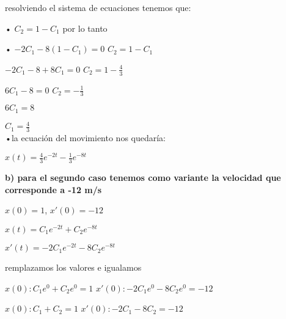 \documentclass[12pt,a4paper]{article}
\begin{document}
\vspace{0.6cm}

resolviendo el sistema de ecuaciones tenemos que:

\vspace{0.3cm}

• $C_{2}=1-C_{1}$   \hspace{5.5cm}   por lo tanto

• $-2C_{1} - 8(1-C_{1})=0 $  \hspace{4.5cm} $C_{2} = 1- C_{1}$

$-2C_{1} - 8 + 8C_{1}=0 $ \hspace{5.2cm} $C_{2} = 1- \frac{4}{3}$

$6C_{1} - 8=0 $  \hspace{6.7 cm}  $C_{2} =- \frac{1}{3}$

$6C_{1} = 8 $

$C_{1} = \frac{4}{3} $\\

•la ecuación del movimiento nos quedaría:

$x(t)= \frac{4}{3}e^{-2t} - \frac{1}{3}e^{-8t}$

\vspace{1.5cm}

\textbf{b) para el segundo caso tenemos como variante la velocidad que corresponde a -12 m/s}

\vspace{0.3cm}

$x(0)=1$, \hspace{1.6cm}  $x'(0)=-12$\\

\vspace{0.4cm}

$x(t)=C_{1}e^{-2t} + C_{2}e^{-8t}$

$x'(t)=-2C_{1}e^{-2t} - 8C_{2}e^{-8t}$

\vspace{0.5cm}

remplazamos los valores e igualamos

\vspace{0.3cm}

$x(0): C_{1}e^{0} + C_{2}e^{0}= 1$ \hspace{4.8cm}$x'(0): -2C_{1}e^{0} - 8C_{2}e^{0}= -12$

$x(0): C_{1} + C_{2} = 1$ \hspace{5.5cm}$x'(0): -2C_{1} -8C_{2} = -12 $


\vspace{0.6cm}
\end{document}

